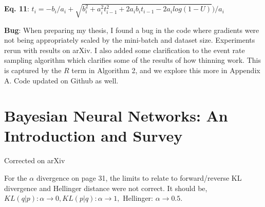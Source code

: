 \documentclass{article}
\begin{document}
\textbf{Eq. 11}: $t_{i} =  -b_{i} / a_{i} + \sqrt{b_{i}^{2} +  a_{i}^{2}t_{i-1}^{2} + 2a_{i}b_{i}t_{i-1} - 2a_{i}log(1 - U)}\big ) /a_{i}$

\textbf{Bug}: When preparing my thesis, I found a bug in the code where gradients were not being appropriately scaled by the mini-batch and dataset size. Experiments rerun with results on arXiv. I also added some clarification to the event rate sampling algorithm which clarifies some of the results of how thinning work. This is captured by the $R$ term in Algorithm 2, and we explore this more in Appendix A. Code updated on Github as well.

\section{Bayesian Neural Networks: An Introduction and Survey}
Corrected on arXiv

For the $\alpha$ divergence on page 31, the limits to relate to forward/reverse KL divergence and Hellinger distance were not correct. It should be, $KL(q|p): \alpha \rightarrow 0, KL(p|q): \alpha \rightarrow 1,$ Hellinger: $ \alpha \rightarrow 0.5$.
\end{document}
